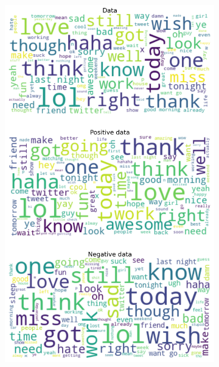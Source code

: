 \documentclass{article}
\begin{document}
\begin{itemize}
\begin{figure}[H]
\begin{subfigure}[b]{0.24\textwidth}
      \includegraphics[width=\textwidth]{chapter-06/section-01-01/03/visualization/3/wordcloud.png}
    \end{subfigure}
    \begin{subfigure}[b]{0.24\textwidth}
      \centering

\end{subfigure}
\end{figure}
\end{itemize}
\end{document}
